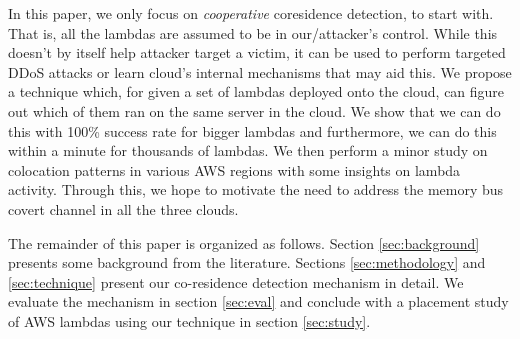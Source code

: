 In this paper, we only focus on \emph{cooperative} coresidence detection, to start with.
That is, all the lambdas are assumed to be in our/attacker's control. While this doesn't 
by itself help attacker target a victim, it can be used to perform targeted DDoS attacks 
or learn cloud's internal mechanisms that may aid this. We propose a technique which, for given a set of lambdas deployed onto the cloud, can figure out which of them 
ran on the same server in the cloud. We show that we can do this with 100\% success 
rate for bigger lambdas and furthermore, we can do this within a minute for thousands 
of lambdas. We then perform a minor study on colocation patterns in various AWS 
regions with some insights on lambda activity.  Through this,
we hope to motivate the need to address the memory bus covert channel in all the three clouds.


The remainder of this paper is organized as follows. Section \ref{sec:background} presents some background from the literature. Sections \ref{sec:methodology} and \ref{sec:technique} present our co-residence detection mechanism in detail. We evaluate the mechanism in section \ref{sec:eval} and conclude with a placement study of AWS lambdas using our technique in section \ref{sec:study}.  


